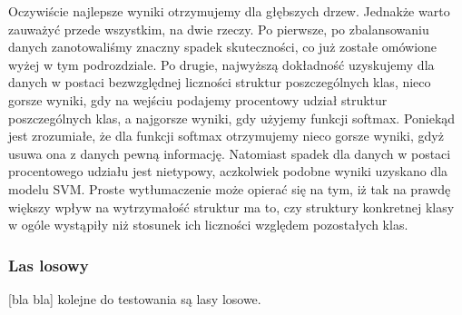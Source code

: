 Oczywiście najlepsze wyniki otrzymujemy dla głębszych drzew. Jednakże warto zauważyć przede wszystkim, na dwie rzeczy. Po pierwsze, po zbalansowaniu danych zanotowaliśmy znaczny spadek skuteczności, co już zostałe omówione wyżej w tym podrozdziale. Po drugie, najwyższą dokładność uzyskujemy dla danych w postaci bezwzględnej liczności struktur poszczególnych klas, nieco gorsze wyniki, gdy na wejściu podajemy procentowy udział struktur poszczególnych klas, a najgorsze wyniki, gdy użyjemy funkcji softmax. Poniekąd jest zrozumiałe, że dla funkcji softmax otrzymujemy nieco gorsze wyniki, gdyż usuwa ona z danych pewną informację. Natomiast spadek dla danych w postaci procentowego udziału jest nietypowy, aczkolwiek podobne wyniki uzyskano dla modelu SVM. Proste wytłumaczenie może opierać się na tym, iż tak na prawdę większy wpływ na wytrzymałość struktur ma to, czy struktury konkretnej klasy w ogóle wystąpiły niż stosunek ich liczności względem pozostałych klas.

\subsubsection{Las losowy}
\label{structures.with.rfc}

[bla bla] kolejne do testowania są lasy losowe.

%
%
%
%
%
%
%


